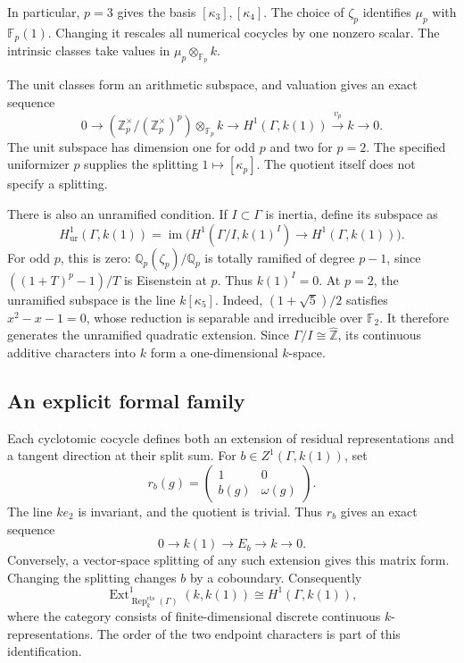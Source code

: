 In particular, \(p=3\) gives the basis \([\kappa_3],[\kappa_4]\).
The choice of \(\zeta_p\) identifies \(\mu_p\) with \(\mathbb F_p(1)\).
Changing it rescales all numerical cocycles by one nonzero scalar.
The intrinsic classes take values in \(\mu_p\otimes_{\mathbb F_p}k\).

The unit classes form an arithmetic subspace, and valuation gives an
exact sequence
\[
 0\longrightarrow
 (\mathbb Z_p^\times/(\mathbb Z_p^\times)^p)\otimes_{\mathbb F_p}k
 \longrightarrow H^1(\Gamma,k(1))
 \xrightarrow{v_p}k\longrightarrow0.
\]
The unit subspace has dimension one for odd \(p\) and two for \(p=2\).
The specified uniformizer \(p\) supplies the splitting
\(1\mapsto[\kappa_p]\). The quotient itself does not specify a splitting.

There is also an unramified condition. If \(I\subset \Gamma\) is inertia,
define its subspace as
\[
 H^1_{\mathrm{ur}}(\Gamma,k(1))
 =\operatorname{im}\bigl(H^1(\Gamma/I,k(1)^I)\to H^1(\Gamma,k(1))\bigr).
\]
For odd \(p\), this is zero: \(\mathbb Q_p(\zeta_p)/\mathbb Q_p\) is
totally ramified of degree \(p-1\), since \(((1+T)^p-1)/T\) is Eisenstein at \(p\). Thus \(k(1)^I=0\).
At \(p=2\), the unramified subspace is the line \(k[\kappa_5]\).
Indeed, \((1+\sqrt5)/2\) satisfies \(x^2-x-1=0\), whose reduction
is separable and irreducible over \(\mathbb F_2\).
It therefore generates the unramified quadratic extension.
Since \(\Gamma/I\cong\widehat{\mathbb Z}\), its continuous additive
characters into \(k\) form a one-dimensional \(k\)-space.

\subsection{An explicit formal family}

Each cyclotomic cocycle defines both an extension of residual
representations and a tangent direction at their split sum.
For \(b\in Z^1(\Gamma,k(1))\), set
\[
 r_b(g)=\begin{pmatrix}1&0\\b(g)&\omega(g)\end{pmatrix}.
\]
The line \(ke_2\) is invariant, and the quotient is trivial. Thus
\(r_b\) gives an exact sequence
\[
 0\longrightarrow k(1)\longrightarrow E_b\longrightarrow k\longrightarrow0.
\]
Conversely, a vector-space splitting of any such extension gives this
matrix form. Changing the splitting changes \(b\) by a coboundary.
Consequently
\[
 \operatorname{Ext}^1_{\operatorname{Rep}^{\mathrm{cts}}_k(\Gamma)}(k,k(1))
 \cong H^1(\Gamma,k(1)),
\]
where the category consists of finite-dimensional discrete continuous
\(k\)-representations. The order of the two endpoint characters is
part of this identification.

